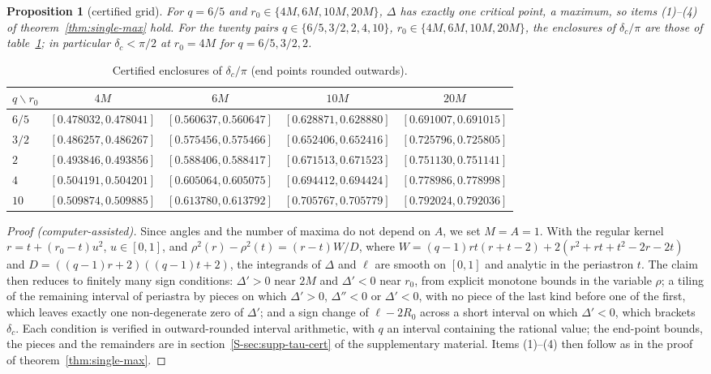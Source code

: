\documentclass[aip,jmp,amsmath,amssymb,reprint]{revtex4-2}
\theoremstyle{plain}
\newtheorem{proposition}{Proposition}[section]
\theoremstyle{definition}
\begin{document}
\begin{proposition}[certified grid]\label{prop:certified}
For $q=6/5$ and $r_0\in\{4M,6M,10M,20M\}$, $\Delta$ has exactly one critical point, a
maximum, so items (1)--(4) of theorem~\ref{thm:single-max} hold. For the twenty pairs
$q\in\{6/5,3/2,2,4,10\}$, $r_0\in\{4M,6M,10M,20M\}$, the enclosures of $\delta_c/\pi$ are
those of table~\ref{tab:deltac}; in particular $\delta_c<\pi/2$ at $r_0=4M$ for
$q=6/5,3/2,2$.
\end{proposition}

\begin{table}[h]
\centering
\caption{Certified enclosures of $\delta_c/\pi$ (end points rounded outwards).}
\label{tab:deltac}
\small\setlength{\tabcolsep}{4pt}
\begin{tabular}{lcccc}
\hline
$q\backslash r_0$ & $4M$ & $6M$ & $10M$ & $20M$\\
\hline
$6/5$ & $[0.478032,0.478041]$ & $[0.560637,0.560647]$ & $[0.628871,0.628880]$ & $[0.691007,0.691015]$\\
$3/2$ & $[0.486257,0.486267]$ & $[0.575456,0.575466]$ & $[0.652406,0.652416]$ & $[0.725796,0.725805]$\\
$2$   & $[0.493846,0.493856]$ & $[0.588406,0.588417]$ & $[0.671513,0.671523]$ & $[0.751130,0.751141]$\\
$4$   & $[0.504191,0.504201]$ & $[0.605064,0.605075]$ & $[0.694412,0.694424]$ & $[0.778986,0.778998]$\\
$10$  & $[0.509874,0.509885]$ & $[0.613780,0.613792]$ & $[0.705767,0.705779]$ & $[0.792024,0.792036]$\\
\hline
\end{tabular}
\end{table}

\begin{proof}[Proof (computer-assisted)]
Since angles and the number of maxima do not depend on $A$, we set $M=A=1$. With the regular kernel
$r=t+(r_0-t)u^2$, $u\in[0,1]$, and $\rho^2(r)-\rho^2(t)=(r-t)W/D$, where
$W=(q-1)rt(r+t-2)+2(r^2+rt+t^2-2r-2t)$ and $D=((q-1)r+2)((q-1)t+2)$, the integrands of $\Delta$ and $\ell$
are smooth on $[0,1]$ and analytic in the periastron $t$. The claim then reduces to finitely many sign
conditions: $\Delta'>0$ near $2M$ and $\Delta'<0$ near $r_0$, from explicit monotone bounds in the variable
$\rho$; a tiling of the remaining interval of periastra by pieces on which $\Delta'>0$, $\Delta''<0$ or
$\Delta'<0$, with no piece of the last kind before one of the first, which leaves exactly one
non-degenerate zero of $\Delta'$; and a sign change of $\ell-2R_0$ across a short interval on which
$\Delta'<0$, which brackets $\delta_c$. Each condition is verified in outward-rounded interval
arithmetic, with $q$ an interval containing the rational value; the end-point bounds, the pieces and
the remainders are in section~\ref{S-sec:supp-tau-cert} of the supplementary material. Items (1)--(4) then
follow as in the proof of theorem~\ref{thm:single-max}.
\end{proof}
\end{document}
